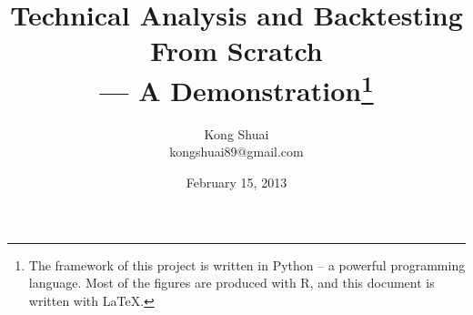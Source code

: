 \documentclass[12pt,a4paper]{article}
\begin{document}
	
\title{Technical Analysis and Backtesting\\ From Scratch
	\\[2ex]--- A Demonstration\footnote{
			The framework of this project is 
			written in Python -- a powerful programming language. 
			Most of the figures are produced with R, 
			and this document is written with \LaTeX{}.}
			}

	
\author{Kong Shuai\\
kongshuai89@gmail.com}
\date{February 15, 2013}
\maketitle

\end{document}

